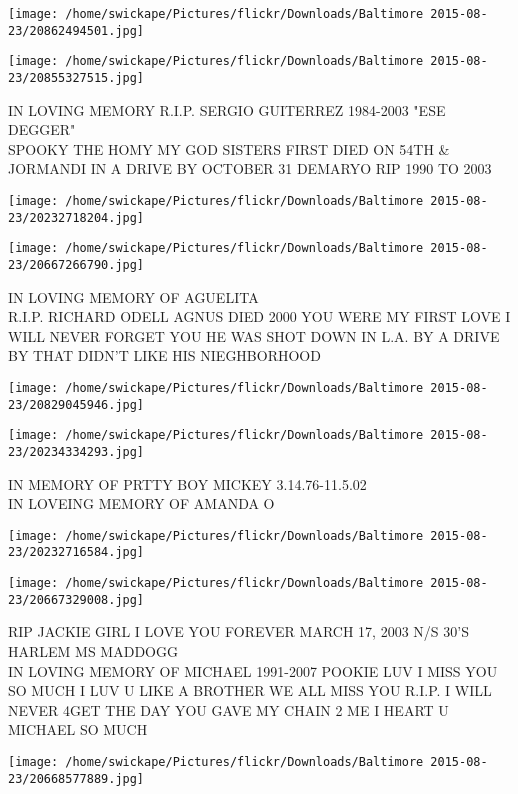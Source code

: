 \documentclass[10pt,letterpaper]{article}
\begin{document}
\texttt{[image: /home/swickape/Pictures/flickr/Downloads/Baltimore 2015-08-23/20862494501.jpg]}

\vspace{0.25in}
\texttt{[image: /home/swickape/Pictures/flickr/Downloads/Baltimore 2015-08-23/20855327515.jpg]}

IN LOVING MEMORY R.I.P. SERGIO GUITERREZ 1984{-}2003 "ESE DEGGER"\\
SPOOKY THE HOMY MY GOD SISTERS FIRST DIED ON 54TH \& JORMANDI IN A DRIVE BY OCTOBER 31 DEMARYO RIP 1990 TO 2003
\pagebreak

\texttt{[image: /home/swickape/Pictures/flickr/Downloads/Baltimore 2015-08-23/20232718204.jpg]}

\vspace{0.25in}
\texttt{[image: /home/swickape/Pictures/flickr/Downloads/Baltimore 2015-08-23/20667266790.jpg]}

IN LOVING MEMORY OF AGUELITA\\
R.I.P. RICHARD ODELL AGNUS DIED 2000 YOU WERE MY FIRST LOVE I WILL NEVER FORGET YOU HE WAS SHOT DOWN IN L.A. BY A DRIVE BY THAT DIDN'T LIKE HIS NIEGHBORHOOD
\pagebreak

\texttt{[image: /home/swickape/Pictures/flickr/Downloads/Baltimore 2015-08-23/20829045946.jpg]}

\vspace{0.25in}
\texttt{[image: /home/swickape/Pictures/flickr/Downloads/Baltimore 2015-08-23/20234334293.jpg]}

IN MEMORY OF PRTTY BOY MICKEY 3.14.76{-}11.5.02\\
IN LOVEING MEMORY OF AMANDA O
\pagebreak

\texttt{[image: /home/swickape/Pictures/flickr/Downloads/Baltimore 2015-08-23/20232716584.jpg]}

\vspace{0.25in}
\texttt{[image: /home/swickape/Pictures/flickr/Downloads/Baltimore 2015-08-23/20667329008.jpg]}

RIP JACKIE GIRL I LOVE YOU FOREVER MARCH 17, 2003 N/S 30'S HARLEM MS MADDOGG\\
IN LOVING MEMORY OF MICHAEL 1991{-}2007 POOKIE LUV I MISS YOU SO MUCH I LUV U LIKE A BROTHER WE ALL MISS YOU R.I.P. I WILL NEVER 4GET THE DAY YOU GAVE MY CHAIN 2 ME I HEART U MICHAEL SO MUCH
\pagebreak

\texttt{[image: /home/swickape/Pictures/flickr/Downloads/Baltimore 2015-08-23/20668577889.jpg]}
\end{document}
